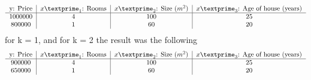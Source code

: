 \documentclass{article}
\begin{document}
    \begin{equation}
        \begin{tabular}{ c | c | c | c }
            y: Price & $x\textprime_1$: Rooms & $x\textprime_2$: Size ($m^2$) & $x\textprime_3$: Age of house (years)\\ \hline
            1000000 & 4 & 100 & 25\\
            800000 & 1 & 60 & 20\\ 
        \end{tabular}
    \end{equation}
    for k = 1, and for k = 2 the result was the following
    \begin{equation}
        \begin{tabular}{ c | c | c | c }
            y: Price & $x\textprime_1$: Rooms & $x\textprime_2$: Size ($m^2$) & $x\textprime_3$: Age of house (years)\\ \hline
            900000 & 4 & 100 & 25\\
            650000 & 1 & 60 & 20\\ 
        \end{tabular}
    \end{equation}
    
\end{document}
